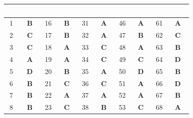 \documentclass[11pt,a4paper]{article}
\begin{document}
\begin{center}
\renewcommand{\arraystretch}{1.3}
\small
\begin{tabular}{|c|c||c|c||c|c||c|c||c|c|}
\hline
\rowcolor{tableDarkHeader}
\textcolor{white}{\textbf{Q.}} & \textcolor{white}{\textbf{Ans.}} & \textcolor{white}{\textbf{Q.}} & \textcolor{white}{\textbf{Ans.}} & \textcolor{white}{\textbf{Q.}} & \textcolor{white}{\textbf{Ans.}} & \textcolor{white}{\textbf{Q.}} & \textcolor{white}{\textbf{Ans.}} & \textcolor{white}{\textbf{Q.}} & \textcolor{white}{\textbf{Ans.}} \\
\hline\hline
\rowcolor{white}
1 & \textbf{\textcolor{l1Green}{B}} & 16 & \textbf{\textcolor{l1Green}{B}} & 31 & \textbf{\textcolor{l2Amber}{A}} & 46 & \textbf{\textcolor{l2Amber}{A}} & 61 & \textbf{\textcolor{l3Crimson}{A}} \\
\hline
\rowcolor{tableStripe}
2 & \textbf{\textcolor{l1Green}{C}} & 17 & \textbf{\textcolor{l1Green}{B}} & 32 & \textbf{\textcolor{l2Amber}{A}} & 47 & \textbf{\textcolor{l2Amber}{B}} & 62 & \textbf{\textcolor{l3Crimson}{C}} \\
\hline
\rowcolor{white}
3 & \textbf{\textcolor{l1Green}{C}} & 18 & \textbf{\textcolor{l1Green}{A}} & 33 & \textbf{\textcolor{l2Amber}{C}} & 48 & \textbf{\textcolor{l2Amber}{A}} & 63 & \textbf{\textcolor{l3Crimson}{B}} \\
\hline
\rowcolor{tableStripe}
4 & \textbf{\textcolor{l1Green}{A}} & 19 & \textbf{\textcolor{l1Green}{A}} & 34 & \textbf{\textcolor{l2Amber}{C}} & 49 & \textbf{\textcolor{l2Amber}{C}} & 64 & \textbf{\textcolor{l3Crimson}{D}} \\
\hline
\rowcolor{white}
5 & \textbf{\textcolor{l1Green}{D}} & 20 & \textbf{\textcolor{l1Green}{B}} & 35 & \textbf{\textcolor{l2Amber}{A}} & 50 & \textbf{\textcolor{l2Amber}{D}} & 65 & \textbf{\textcolor{l3Crimson}{B}} \\
\hline
\rowcolor{tableStripe}
6 & \textbf{\textcolor{l1Green}{B}} & 21 & \textbf{\textcolor{l1Green}{C}} & 36 & \textbf{\textcolor{l2Amber}{C}} & 51 & \textbf{\textcolor{l3Crimson}{A}} & 66 & \textbf{\textcolor{l3Crimson}{D}} \\
\hline
\rowcolor{white}
7 & \textbf{\textcolor{l1Green}{B}} & 22 & \textbf{\textcolor{l1Green}{A}} & 37 & \textbf{\textcolor{l2Amber}{A}} & 52 & \textbf{\textcolor{l3Crimson}{A}} & 67 & \textbf{\textcolor{l3Crimson}{B}} \\
\hline
\rowcolor{tableStripe}
8 & \textbf{\textcolor{l1Green}{B}} & 23 & \textbf{\textcolor{l1Green}{C}} & 38 & \textbf{\textcolor{l2Amber}{B}} & 53 & \textbf{\textcolor{l3Crimson}{C}} & 68 & \textbf{\textcolor{l3Crimson}{A}} \\

\end{tabular}
\end{center}
\end{document}
